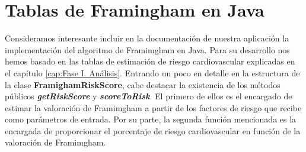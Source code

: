 \chapter{Tablas de Framingham en Java}
\label{cap:AnexoA}

Consideramos interesante incluir en la documentación de nuestra aplicación la implementación del algoritmo de Framimgham en Java. Para su desarrollo nos hemos basado en las tablas de estimación de riesgo cardiovascular explicadas en el capítulo \ref{cap:Fase I. Análisis}. Entrando un poco en detalle en la estructura de la clase \textbf{FramighamRiskScore}, cabe destacar la existencia de los métodos públicos \emph{\textbf{getRiskScore}} y \emph{\textbf{scoreToRisk}}. El primero de ellos es el encargado de estimar la valoración de Framimgham a partir de los factores de riesgo que recibe como parámetros de entrada. Por su parte, la segunda función mencionada es la encargada de proporcionar el porcentaje de riesgo cardiovascular en función de la valoración de Framimgham.


